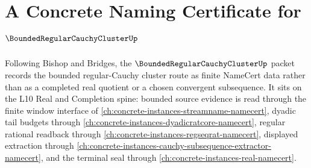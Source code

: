 \chapter{A Concrete Naming Certificate for $\BoundedRegularCauchyClusterUp$}
\label{ch:concrete-instances-bounded-regular-cauchy-cluster-namecert}

Following Bishop and Bridges, the $\BoundedRegularCauchyClusterUp$ packet records the bounded regular-Cauchy cluster route as finite NameCert data rather than as a completed real quotient or a chosen convergent subsequence. It sits on the L10 Real and Completion spine: bounded source evidence is read through the finite window interface of \autoref{ch:concrete-instances-streamname-namecert}, dyadic tail budgets through \autoref{ch:concrete-instances-dyadicratcore-namecert}, regular rational readback through \autoref{ch:concrete-instances-regseqrat-namecert}, displayed extraction through \autoref{ch:concrete-instances-cauchy-subsequence-extractor-namecert}, and the terminal seal through \autoref{ch:concrete-instances-real-namecert}.

